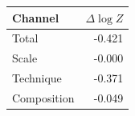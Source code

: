 \begin{tabular}{lr}
\toprule
Channel & $\Delta\log Z$ \\
\midrule
Total & -0.421 \\
Scale & -0.000 \\
Technique & -0.371 \\
Composition & -0.049 \\
\bottomrule
\end{tabular}
